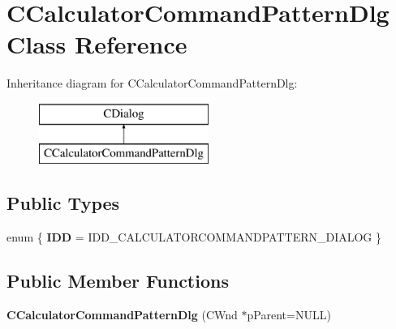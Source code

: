 \hypertarget{class_c_calculator_command_pattern_dlg}{}\section{C\+Calculator\+Command\+Pattern\+Dlg Class Reference}
\label{class_c_calculator_command_pattern_dlg}
Inheritance diagram for C\+Calculator\+Command\+Pattern\+Dlg\+:\begin{figure}[H]
\begin{center}
\leavevmode
\includegraphics[height=2.000000cm]{class_c_calculator_command_pattern_dlg}
\end{center}
\end{figure}
\subsection*{Public Types}
\begin{DoxyCompactItemize}
\item 
\hypertarget{class_c_calculator_command_pattern_dlg_adb107853175bd06f53d8da3ce8888855}{}enum \{ {\bfseries I\+D\+D} = I\+D\+D\+\_\+\+C\+A\+L\+C\+U\+L\+A\+T\+O\+R\+C\+O\+M\+M\+A\+N\+D\+P\+A\+T\+T\+E\+R\+N\+\_\+\+D\+I\+A\+L\+O\+G
 \}\label{class_c_calculator_command_pattern_dlg_adb107853175bd06f53d8da3ce8888855}

\end{DoxyCompactItemize}
\subsection*{Public Member Functions}
\begin{DoxyCompactItemize}
\item 
\hypertarget{class_c_calculator_command_pattern_dlg_acbc3a8081abb686dd2a0b770d46c6a90}{}{\bfseries C\+Calculator\+Command\+Pattern\+Dlg} (C\+Wnd $\ast$p\+Parent=N\+U\+L\+L)\label{class_c_calculator_command_pattern_dlg_acbc3a8081abb686dd2a0b770d46c6a90}

\end{DoxyCompactItemize}
